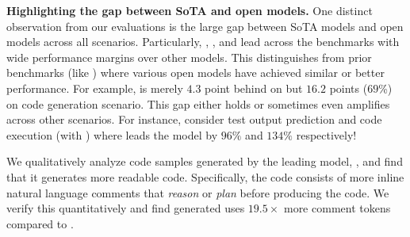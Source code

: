 
\vspace{1pt}
\noindent \textbf{Highlighting the gap between SoTA and open models.} 
One distinct observation from our evaluations is the large gap between SoTA models and open models across all scenarios.
Particularly, \gptfourturbo{}, \gptfour{}, \geminiproonefive{} and \claudeopus{} lead across the benchmarks with wide performance margins over other models.
This distinguishes \livecodebench{} from prior benchmarks (like \humaneval{}) where various open models have achieved similar or better performance. 
For example,  is merely $4.3$ point behind \gptfourturbo{} on \humanevalplus{} but 
$16.2$ points ($69$\%) on \lcb{} code generation scenario.
This gap either holds or sometimes even amplifies across other scenarios.
For instance, consider test output prediction and code execution (with \chainot{}) where \gptfourturbo{} leads the  model by $96\%$ and $134\%$ respectively!

We qualitatively analyze code samples generated by the leading model, \gptfourturbo{}, and find that it generates more readable code.
Specifically, the code consists of more inline natural language comments that \textit{reason} or \textit{plan} before producing the code.
We verify this quantitatively and find \gptfourturbo{} generated uses $19.5\times$ more comment tokens compared to \gptfour{}.

